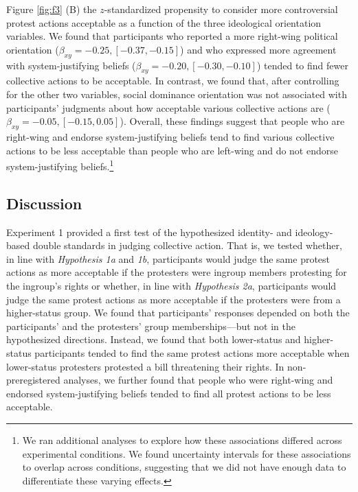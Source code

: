 \documentclass[12pt, letterpaper]{article}
\begin{document}
Figure \ref{fig:f3} (B) the \(z\)-standardized propensity to consider
more controversial protest actions acceptable as a function of the three
ideological orientation variables. We found that participants who
reported a more right-wing political orientation
(\(\beta_{xy} = -0.25, [-0.37, -0.15]\)) and who expressed more
agreement with system-justifying beliefs
(\(\beta_{xy} = -0.20, [-0.30, -0.10]\)) tended to find fewer collective
actions to be acceptable. In contrast, we found that, after controlling
for the other two variables, social dominance orientation was not
associated with participants' judgments about how acceptable various
collective actions are (\(\beta_{xy} = -0.05, [-0.15, 0.05]\)). Overall,
these findings suggest that people who are right-wing and endorse
system-justifying beliefs tend to find various collective actions to be
less acceptable than people who are left-wing and do not endorse
system-justifying beliefs.\footnote{We ran additional analyses to
  explore how these associations differed across experimental
  conditions. We found uncertainty intervals for these associations to
  overlap across conditions, suggesting that we did not have enough data
  to differentiate these varying effects.}

\hypertarget{discussion}{%
\subsection{Discussion}\label{discussion}}

Experiment 1 provided a first test of the hypothesized identity- and
ideology-based double standards in judging collective action. That is,
we tested whether, in line with \emph{Hypothesis 1a} and \emph{1b},
participants would judge the same protest actions as more acceptable if
the protesters were ingroup members protesting for the ingroup's rights
or whether, in line with \emph{Hypothesis 2a}, participants would judge
the same protest actions as more acceptable if the protesters were from
a higher-status group. We found that participants' responses depended on
both the participants' and the protesters' group memberships---but not
in the hypothesized directions. Instead, we found that both lower-status
and higher-status participants tended to find the same protest actions
more acceptable when lower-status protesters protested a bill
threatening their rights. In non-preregistered analyses, we further
found that people who were right-wing and endorsed system-justifying
beliefs tended to find all protest actions to be less acceptable.
\end{document}
